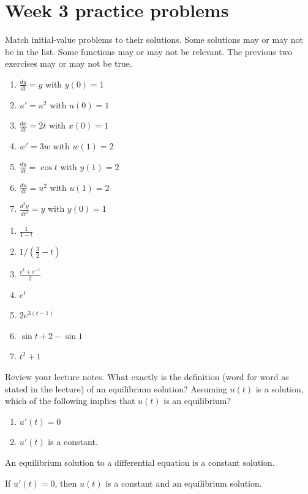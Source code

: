 \documentclass[../main.tex]{subfiles}
\begin{document}
\section{Week 3 practice problems}

\begin{exercise}
  Match initial-value problems to their solutions.  Some solutions may or may not be in the list. Some functions may or may not be relevant. The previous two exercises may or may not be true.

  \begin{minipage}{0.45\textwidth}
    \begin{enumerate}[itemsep=2ex, label=(\Alph*)]
      \item \(\frac{dy}{dt} = y\) with \(y(0) = 1\)
      \item \(u' = u^2\) with \(u(0) = 1\)
      \item \(\frac{dx}{dt} = 2t\) with \(x(0) = 1\)
      \item \(w' = 3w\) with \(w(1) = 2\)
      \item \(\frac{dy}{dt} = \cos t\) with \(y(1) = 2\)
      \item \(\frac{du}{dt} = u^2\) with \(u(1) = 2\)
      \item \(\frac{d^2y}{dt^2} = y\) with \(y(0) = 1\)
    \end{enumerate}
  \end{minipage}
  \begin{minipage}{0.45\textwidth}
    \begin{enumerate}[itemsep=2ex, label=(\alph*)]
      \item \(\frac{1}{1 - t}\)
      \item \(1/(\tfrac{3}{2} - t)\)
      \item \(\frac{e^t + e^{-t}}{2}\)
      \item \(e^{t}\)
      \item \(2e^{3(t-1)}\)
      \item \(\sin t + 2 - \sin 1\)
      \item \(t^2 + 1\)
    \end{enumerate}   
  \end{minipage}
\end{exercise}

\begin{exercise}
  Review your lecture notes. What exactly is the definition (word for word as stated in the lecture) of an equilibrium solution? Assuming \(u(t)\) is a solution, which of the following implies that \(u(t)\) is an equilibrium?

  \begin{enumerate}
    \item \(u'(t) = 0\)
    \item \(u'(t)\) is a constant.
  \end{enumerate}

  \begin{solution}
    An equilibrium solution to a differential equation is a constant solution. 

    If \(u'(t) = 0\), then \(u(t)\) is a constant and an equilibrium solution.
  \end{solution}
\end{exercise}
\end{document}
